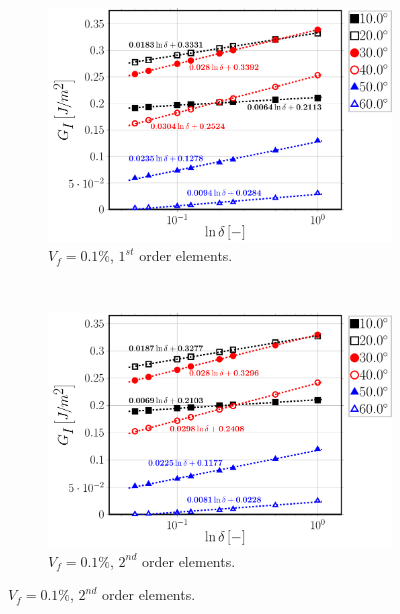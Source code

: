 \begin{figure}[!h]
\centering
    \begin{subfigure}[b]{0.45\textwidth}
        \includegraphics[width=\textwidth]{paperA/Vf0_1-free-1st-semilogvsDelta-GI.pdf}
       \caption{$V_{f}=0.1\%$, $1^{st}$ order elements.}
    \end{subfigure}
    ~
    \begin{subfigure}[b]{0.45\textwidth}
        \includegraphics[width=\textwidth]{paperA/Vf0_1-free-2nd-semilogvsDelta-GI.pdf}
       \caption{$V_{f}=0.1\%$, $2^{nd}$ order elements.}
    \end{subfigure}


\end{figure}

